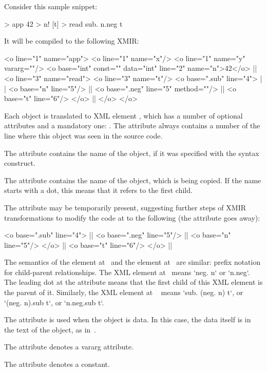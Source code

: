 Consider this sample \eo{} snippet:

\begin{ffcode}
[x y...] > app
  42 > n!
  [t] > read
    sub.
      n.neg
      t
\end{ffcode}

It will be compiled to the following XMIR:

\begin{ffcode}
<o line="1" name="app">
  <o line="1" name="x"/>
  <o line="1" name="y" vararg=""/>
  <o base="int" const="" data="int"
    line="2" name="n">42</o>   |$\label{ln:xml-data}$|
  <o line="3" name="read">
    <o line="3" name="t"/>
    <o base=".sub" line="4"> |$\label{ln:xml-sub}$|
      <o base="n" line="5"/> |$\label{ln:method-start}$|
      <o base=".neg" line="5" method=""/>  |$\label{ln:method-end}$|
      <o base="t" line="6"/>
    </o> |$\label{ln:xml-sub-end}$|
  </o>
</o>
\end{ffcode}

Each object is translated to XML element , which has
a number of optional attributes and a mandatory one: .
The attribute  always contains a number of the
line where this object was seen in the source code.

The attribute  contains the name of the object, if
it was specified with the \ff{>} syntax construct.

The attribute  contains the name of the object, which
is being copied. If the name starts with a dot, this means
that it refers to the first  child.

The attribute  may be temporarily present, suggesting
further steps of XMIR transformations to modify the code
at  to the following (the attribute 
goes away):

\begin{ffcode}
<o base=".sub" line="4"> |$\label{ln:new-sub}$|
  <o base=".neg" line="5"/> |$\label{ln:xml-neg}$|
    <o base="n" line="5"/>
  </o> |$\label{ln:xml-neg-end}$|
  <o base="t" line="6"/>
</o> |$\label{ln:new-sub-end}$|
\end{ffcode}

The semantics of the element  at~
and the element  at~ are similar: prefix
notation for child-parent relationships. The XML element at~
means `neg. n` or `n.neg`. The
leading dot at the attribute  means that the first
child of this XML element is the \eo{} parent of it.
Similarly, the XML element at ~
means `sub. (neg. n) t`, or `(neg. n).sub t`, or `n.neg.sub t`.

The attribute  is used when the object is data. In this
case, the data itself is in the text of the object, as in~.

The attribute  denotes a vararg attribute.

The attribute  denotes a constant.
